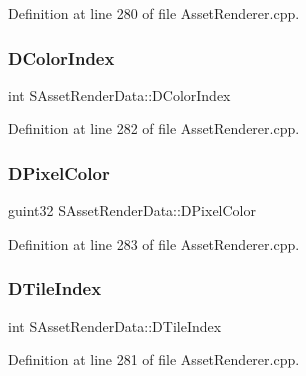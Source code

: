 Definition at line 280 of file Asset\+Renderer.\+cpp.

\hypertarget{structSAssetRenderData_a589dca7066d667b74c954b9b16671454}{}\label{structSAssetRenderData_a589dca7066d667b74c954b9b16671454} 
\subsubsection{\texorpdfstring{D\+Color\+Index}{DColorIndex}}
{\footnotesize\ttfamily int S\+Asset\+Render\+Data\+::\+D\+Color\+Index}



Definition at line 282 of file Asset\+Renderer.\+cpp.

\hypertarget{structSAssetRenderData_a94ac857717a32afcd7118316df5f8d88}{}\label{structSAssetRenderData_a94ac857717a32afcd7118316df5f8d88} 
\subsubsection{\texorpdfstring{D\+Pixel\+Color}{DPixelColor}}
{\footnotesize\ttfamily guint32 S\+Asset\+Render\+Data\+::\+D\+Pixel\+Color}



Definition at line 283 of file Asset\+Renderer.\+cpp.

\hypertarget{structSAssetRenderData_a8c97c7f34d5b359f6fa23ce215a09929}{}\label{structSAssetRenderData_a8c97c7f34d5b359f6fa23ce215a09929} 
\subsubsection{\texorpdfstring{D\+Tile\+Index}{DTileIndex}}
{\footnotesize\ttfamily int S\+Asset\+Render\+Data\+::\+D\+Tile\+Index}



Definition at line 281 of file Asset\+Renderer.\+cpp.

\hypertarget{structSAssetRenderData_ae986cfe9d4238fa31fb511b40392d97f}{}\label{structSAssetRenderData_ae986cfe9d4238fa31fb511b40392d97f} 
